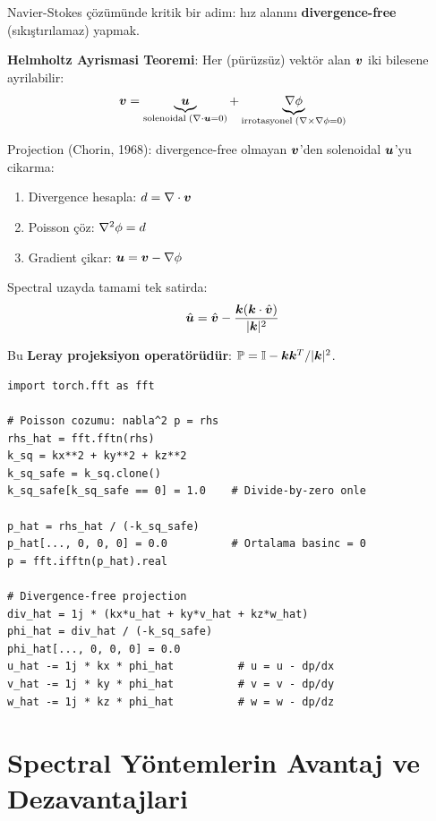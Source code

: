 Navier-Stokes çözümünde kritik bir adim: hız alanını \textbf{divergence-free} (sıkıştırılamaz) yapmak.

\textbf{Helmholtz Ayrismasi Teoremi}: Her (pürüzsüz) vektör alan $\bm{v}$ iki bilesene ayrilabilir:
\begin{equation}
\bm{v} = \underbrace{\bm{u}}_{\text{solenoidal}\;(\nabla \cdot\bm{u}=0)} + \underbrace{\nabla\phi}_{\text{irrotasyonel}\;(\nabla \times\nabla\phi=0)}
\label{eq:helmholtz}
\end{equation}

Projection (Chorin, 1968): divergence-free olmayan $\bm{v}$'den solenoidal $\bm{u}$'yu cikarma:
\begin{enumerate}
\item Divergence hesapla: $d = \nabla \cdot\bm{v}$
\item Poisson çöz: $\nabla^2\phi = d$
\item Gradient çikar: $\bm{u} = \bm{v} - \nabla\phi$
\end{enumerate}

Spectral uzayda tamami tek satirda:
\begin{equation}
\hat{\bm{u}} = \hat{\bm{v}} - \frac{\bm{k}(\bm{k}\cdot\hat{\bm{v}})}{|\bm{k}|^2}
\label{eq:leray_projection}
\end{equation}

Bu \textbf{Leray projeksiyon operatörüdür}: $\mathbb{P} = \mathbb{I} - \bm{k}\bm{k}^T / |\bm{k}|^2$.

\begin{lstlisting}[caption={Spectral Poisson çözümü ve projection},label={lst:poisson}]
import torch.fft as fft

# Poisson cozumu: nabla^2 p = rhs
rhs_hat = fft.fftn(rhs)
k_sq = kx**2 + ky**2 + kz**2
k_sq_safe = k_sq.clone()
k_sq_safe[k_sq_safe == 0] = 1.0    # Divide-by-zero onle

p_hat = rhs_hat / (-k_sq_safe)
p_hat[..., 0, 0, 0] = 0.0          # Ortalama basinc = 0
p = fft.ifftn(p_hat).real

# Divergence-free projection
div_hat = 1j * (kx*u_hat + ky*v_hat + kz*w_hat)
phi_hat = div_hat / (-k_sq_safe)
phi_hat[..., 0, 0, 0] = 0.0
u_hat -= 1j * kx * phi_hat          # u = u - dp/dx
v_hat -= 1j * ky * phi_hat          # v = v - dp/dy
w_hat -= 1j * kz * phi_hat          # w = w - dp/dz
\end{lstlisting}


\section{Spectral Yöntemlerin Avantaj ve Dezavantajlari}
\label{sec:spectral_tradeoffs}

